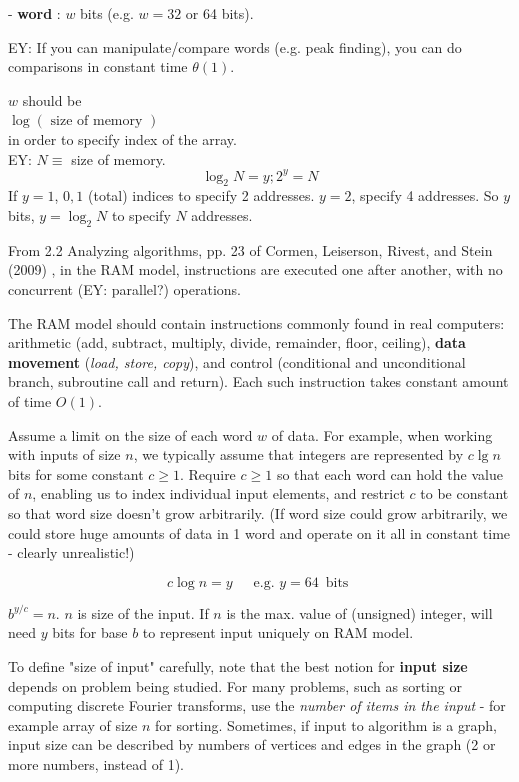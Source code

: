 \documentclass[10pt]{amsart}
\begin{document}
\begin{multicols*}{2}
- \textbf{word} : $w$ bits (e.g. $w = 32$ or 64 bits).

EY: If you can manipulate/compare words (e.g. peak finding), you can do comparisons in constant time $\theta(1)$. 

$w$ should be \\
$\log{(\text{ size of memory })}$ \\
in order to specify index of the array. \\

EY: $N \equiv$ size of memory. 
\[
\log_2{N} = y; 2^y = N
\]
If $y=1$, $0,1$ (total) indices to specify 2 addresses. $y=2$, specify 4 addresses. So $y$ bits, $y=\log_2{N}$ to specify $N$ addresses.

From 2.2 Analyzing algorithms, pp. 23 of Cormen, Leiserson, Rivest, and Stein (2009) \cite{CLRS2009}, in the RAM model, instructions are executed one after another, with no concurrent (EY: parallel?) operations.

The RAM model should contain instructions commonly found in real computers: arithmetic (add, subtract, multiply, divide, remainder, floor, ceiling), \textbf{data movement} (\emph{load, store, copy}), and control (conditional and unconditional branch, subroutine call and return). Each such instruction takes constant amount of time $O(1)$.

Assume a limit on the size of each word $w$ of data. For example, when working with inputs of size $n$, we typically assume that integers are represented by $c\lg{n}$ bits for some constant $c\geq 1$. Require $c\geq 1$ so that each word can hold the value of $n$, enabling us to index individual input elements, and restrict $c$ to be constant so that word size doesn't grow arbitrarily. (If word size could grow arbitrarily, we could store huge amounts of data in 1 word and operate on it all in constant time - clearly unrealistic!)

\[
c \log{n} =  y \quad \, \text{ e.g. } y = 64 \, \text{ bits }
\]

$b^{y/c} = n$. $n$ is size of the input. If $n$ is the max. value of (unsigned) integer, will need $y$ bits for base $b$ to represent input uniquely on RAM model.

To define "size of input" carefully, note that the best notion for \textbf{input size} depends on problem being studied. For many problems, such as sorting or computing discrete Fourier transforms, use the \emph{number of items in the input} - for example array of size $n$ for sorting. Sometimes, if input to algorithm is a graph, input size can be described by numbers of vertices and edges in the graph (2 or more numbers, instead of 1).



\end{multicols*}
\end{document}
